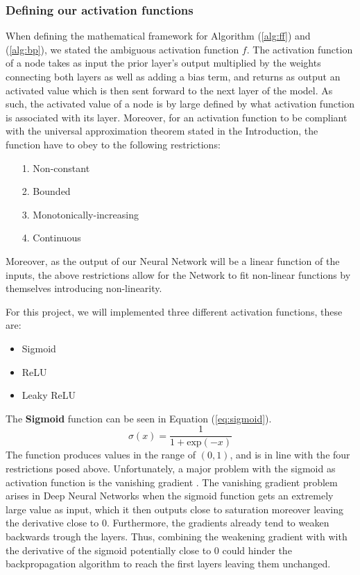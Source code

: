 \documentclass
[twocolumn,
secnumarabic,
nobibnotes,
aps,
prl,
reprint,
groupedaddress,
amsmath,
amssymb
]{revtex4-2}
\begin{document}
\subsubsection{Defining our activation functions}
When defining the mathematical framework for Algorithm (\ref{alg:ff}) and (\ref{alg:bp}), we stated the ambiguous activation function $f$. The activation function of a node takes as input the prior layer's output multiplied by the weights connecting both layers as well as adding a bias term, and returns as output an activated value which is then sent forward to the next layer of the model. As such, the activated value of a node is by large defined by what activation function is associated with its layer. Moreover, for an activation function to be compliant with the universal approximation theorem stated in the Introduction, the function have to obey to the following restrictions:
\begin{itemize}
  \item[1.] Non-constant
  \item[2.] Bounded
  \item[3.] Monotonically-increasing
  \item[4.] Continuous
\end{itemize}
Moreover, as the output of our Neural Network will be a linear function of the inputs, the above restrictions allow for the Network to fit non-linear functions by themselves introducing non-linearity.

For this project, we will implemented three different activation functions, these are:
\begin{itemize}
  \item Sigmoid
  \item ReLU
  \item Leaky ReLU
\end{itemize}

The \textbf{Sigmoid} function can be seen in Equation (\ref{eq:sigmoid}).
\begin{equation}
  \label{eq:sigmoid}
  \sigma(x) = \frac{1}{1 + \text{exp}(-x)}
\end{equation}
The function produces values in the range of $(0,1)$, and is in line with the four restrictions posed above. Unfortunately, a major problem with the sigmoid as activation function is the vanishing gradient \cite{Glorot2010}. The vanishing gradient problem arises in Deep Neural Networks when the sigmoid function gets an extremely large value as input, which it then outputs close to saturation moreover leaving the derivative close to 0. Furthermore, the gradients already tend to weaken backwards trough the layers. Thus, combining the weakening gradient with with the derivative of the sigmoid potentially close to 0 could hinder the backpropagation algorithm to reach the first layers leaving them unchanged.
\end{document}
